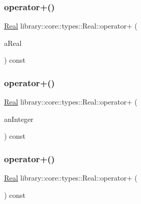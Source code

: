 \mbox{\label{classlibrary_1_1core_1_1types_1_1_real_aee62d1d76e3b0ba37dc9bebdbdcdaaf7}} 
\subsubsection{\texorpdfstring{operator+()}{operator+()}\hspace{0.1cm}{\footnotesize\ttfamily [2/4]}}
{\footnotesize\ttfamily \mbox{\hyperlink{classlibrary_1_1core_1_1types_1_1_real}{Real}} library\+::core\+::types\+::\+Real\+::operator+ (\begin{DoxyParamCaption}\item[{const \mbox{\hyperlink{classlibrary_1_1core_1_1types_1_1_real_a9c5c8826b7e5a8e39544d23fea6c0e1c}{Real\+::\+Value\+Type}} \&}]{a\+Real }\end{DoxyParamCaption}) const}

\mbox{\label{classlibrary_1_1core_1_1types_1_1_real_a5b8ec99c8c2f846228c62724870671e8}} 
\subsubsection{\texorpdfstring{operator+()}{operator+()}\hspace{0.1cm}{\footnotesize\ttfamily [3/4]}}
{\footnotesize\ttfamily \mbox{\hyperlink{classlibrary_1_1core_1_1types_1_1_real}{Real}} library\+::core\+::types\+::\+Real\+::operator+ (\begin{DoxyParamCaption}\item[{const \mbox{\hyperlink{classlibrary_1_1core_1_1types_1_1_integer}{Integer}} \&}]{an\+Integer }\end{DoxyParamCaption}) const}

\mbox{\label{classlibrary_1_1core_1_1types_1_1_real_a7f39b72df1d66f354dce558a99dc2da5}} 
\subsubsection{\texorpdfstring{operator+()}{operator+()}\hspace{0.1cm}{\footnotesize\ttfamily [4/4]}}
{\footnotesize\ttfamily \mbox{\hyperlink{classlibrary_1_1core_1_1types_1_1_real}{Real}} library\+::core\+::types\+::\+Real\+::operator+ (\begin{DoxyParamCaption}{ }\end{DoxyParamCaption}) const}

